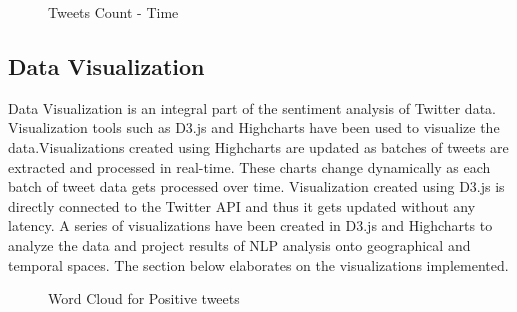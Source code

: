 \documentclass[9pt,twocolumn,twoside]{../../styles/osajnl}
\begin{document}
\begin{figure}[htbp]
    \centering
    \caption{Tweets Count - Time}
    \label{fig:tweetsenti}
    \end{figure}
\subsection{Data Visualization}
Data Visualization is an integral part of the sentiment analysis of Twitter data. Visualization tools such as D3.js and Highcharts \cite{www-Highcharts} have been used to visualize the data.Visualizations created using Highcharts are updated as batches of tweets are extracted and processed in real-time. These charts change dynamically as each batch of tweet data gets processed over time. Visualization created using D3.js is directly connected to the Twitter API and thus it gets updated without any latency. A series of visualizations have been created in D3.js and Highcharts to analyze the data and project results of NLP analysis onto geographical and temporal spaces. The section below elaborates on the visualizations implemented.
    \begin{figure}[htbp]
    \centering
    \caption{Word Cloud for Positive tweets}
    \label{fig:poswordcloud}
    \end{figure}
\end{document}
